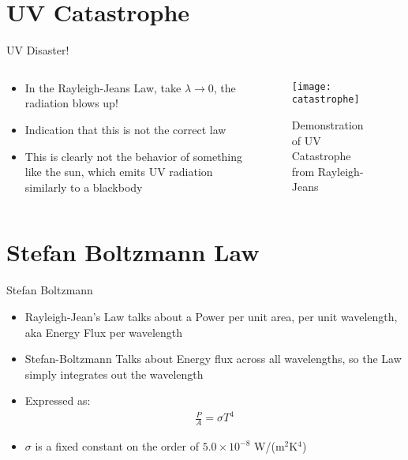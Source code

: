 \documentclass{beamer}
\begin{document}
\section{UV Catastrophe}
\begin{frame}{UV Disaster!}
  \begin{columns}
    \begin{column}{0.5\textwidth}
      \begin{itemize}
      \item In the Rayleigh-Jeans Law, take $\lambda\to0$, the radiation blows up!
      \item Indication that this is not the correct law
      \item This is clearly not the behavior of something like the sun, which emits UV radiation similarly to a blackbody
      \end{itemize}
    \end{column}
    \begin{column}{0.5\textwidth}
      \begin{figure}[H]
        \centering
        \texttt{[image: catastrophe]}
        \caption{Demonstration of UV Catastrophe from Rayleigh-Jeans}
      \end{figure}
    \end{column}
  \end{columns}
\end{frame}

\section{Stefan Boltzmann Law}
\begin{frame}{Stefan Boltzmann}
  \begin{itemize}
  \item Rayleigh-Jean's Law talks about a Power per unit area, per unit wavelength, aka Energy Flux per wavelength
  \item Stefan-Boltzmann Talks about Energy flux across all wavelengths, so the Law simply integrates out the wavelength 
  \item Expressed as:
    \begin{align*}
      \frac{P}{A}=\sigma T^4
    \end{align*}
  \item $\sigma$ is a fixed constant on the order of $5.0\times10^{-8}$ W/(m$^2$K$^4$)
  \end{itemize}
\end{frame}
\end{document}
